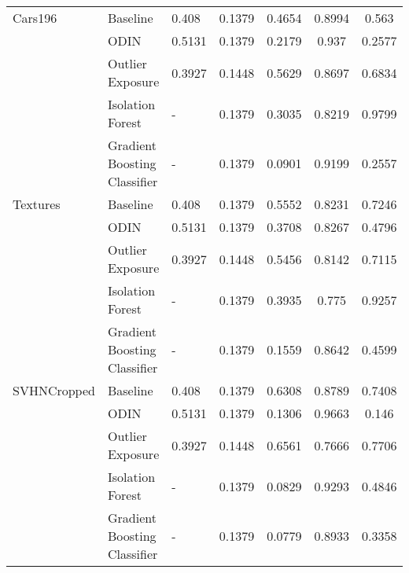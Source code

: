 \documentclass{article}
\begin{document}
\begin{table}[h]
\begin{tabular}{lllHccc}
\midrule
Cars196 & Baseline &         0.408 &               0.1379 &    0.4654 &  0.8994 &          0.563 \\
            & ODIN &        0.5131 &               0.1379 &    0.2179 &   0.937 &         0.2577 \\
            & Outlier Exposure &        0.3927 &               0.1448 &    0.5629 &  0.8697 &         0.6834 \\
            & Isolation Forest &             - &               0.1379 &    0.3035 &  0.8219 &         0.9799 \\
            & Gradient Boosting Classifier &             - &               0.1379 &    0.0901 &  0.9199 &         0.2557 \\
\midrule
Textures & Baseline &         0.408 &               0.1379 &    0.5552 &  0.8231 &         0.7246 \\
            & ODIN &        0.5131 &               0.1379 &    0.3708 &  0.8267 &         0.4796 \\
            & Outlier Exposure &        0.3927 &               0.1448 &    0.5456 &  0.8142 &         0.7115 \\
            & Isolation Forest &             - &               0.1379 &    0.3935 &   0.775 &         0.9257 \\
            & Gradient Boosting Classifier &             - &               0.1379 &    0.1559 &  0.8642 &         0.4599 \\
\midrule
SVHNCropped & Baseline &         0.408 &               0.1379 &    0.6308 &  0.8789 &         0.7408 \\
            & ODIN &        0.5131 &               0.1379 &    0.1306 &  0.9663 &          0.146 \\
            & Outlier Exposure &        0.3927 &               0.1448 &    0.6561 &  0.7666 &         0.7706 \\
            & Isolation Forest &             - &               0.1379 &    0.0829 &  0.9293 &         0.4846 \\
            & Gradient Boosting Classifier &             - &               0.1379 &    0.0779 &  0.8933 &         0.3358 \\
\bottomrule
\end{tabular}
\end{table}
 
\end{document}
